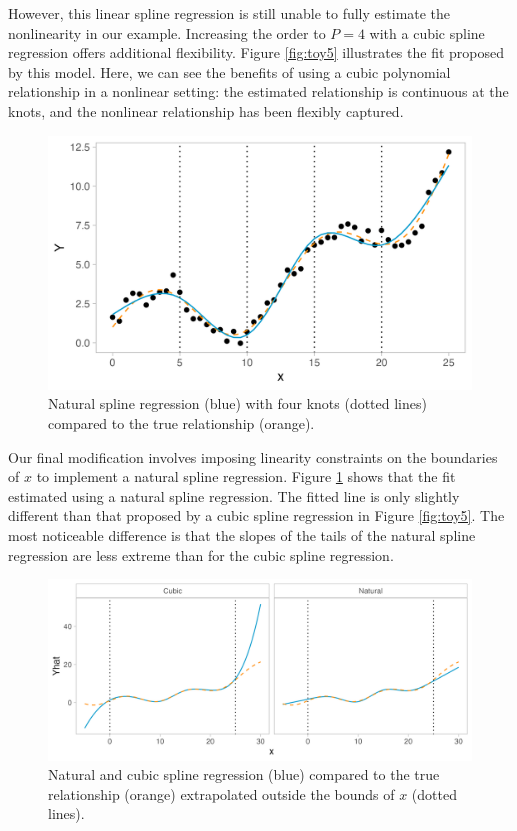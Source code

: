 \documentclass[12pt, twoside]{amherstthesis}
\begin{document}
However, this linear spline regression is still unable to fully estimate the nonlinearity in our example. Increasing the order to \(P=4\) with a cubic spline regression offers additional flexibility. Figure \ref{fig:toy5} illustrates the fit proposed by this model. Here, we can see the benefits of using a cubic polynomial relationship in a nonlinear setting: the estimated relationship is continuous at the knots, and the nonlinear relationship has been flexibly captured.
\begin{figure}

{\centering \includegraphics[width=0.75\linewidth]{figures/ch3_toy6} 

}

\caption{Natural spline regression (blue) with four knots (dotted lines) compared to the true relationship (orange).}\label{fig:toy6}
\end{figure}
Our final modification involves imposing linearity constraints on the boundaries of \(x\) to implement a natural spline regression. Figure \ref{fig:toy6} shows that the fit estimated using a natural spline regression. The fitted line is only slightly different than that proposed by a cubic spline regression in Figure \ref{fig:toy5}. The most noticeable difference is that the slopes of the tails of the natural spline regression are less extreme than for the cubic spline regression.
\begin{figure}

{\centering \includegraphics[width=1\linewidth]{figures/ch3_toybounds} 

}

\caption{Natural and cubic spline regression (blue) compared to the true relationship (orange) extrapolated outside the bounds of $x$ (dotted lines).}\label{fig:toybounds}
\end{figure}
\end{document}
